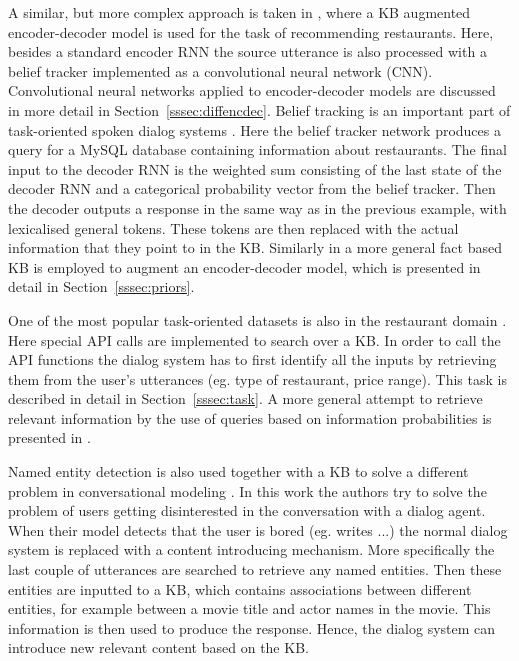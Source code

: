 \documentclass[12pt]{article}
\begin{document}
A similar, but more complex approach is taken in \cite{Wen:2016}, where a KB augmented encoder-decoder model is used for the task of recommending restaurants. Here, besides a standard encoder RNN the source utterance is also processed with a belief tracker implemented as a convolutional neural network (CNN). Convolutional neural networks applied to encoder-decoder models are discussed in more detail in Section~\ref{sssec:diffencdec}. Belief tracking is an important part of task-oriented spoken dialog systems \cite{Henderson:2015}. Here the belief tracker network produces a query for a MySQL database containing information about restaurants. The final input to the decoder RNN is the weighted sum consisting of the last state of the decoder RNN and a categorical probability vector from the belief tracker. Then the decoder outputs a response in the same way as in the previous example, with lexicalised general tokens. These tokens are then replaced with the actual information that they point to in the KB. Similarly in \cite{Ghazvininejad:2017} a more general fact based KB is employed to augment an encoder-decoder model, which is presented in detail in Section~\ref{sssec:priors}.

One of the most popular task-oriented datasets is also in the restaurant domain \cite{Joshi:2017}. Here special API calls are implemented to search over a KB. In order to call the API functions the dialog system has to first identify all the inputs by retrieving them from the user's utterances (eg. type of restaurant, price range). This task is described in detail in Section~\ref{sssec:task}. A more general attempt to retrieve relevant information by the use of queries based on information probabilities is presented in \cite{Yin:2017}.

Named entity detection is also used together with a KB to solve a different problem in conversational modeling \cite{stalemate:2016}. In this work the authors try to solve the problem of users getting disinterested in the conversation with a dialog agent. When their model detects that the user is bored (eg. writes ...) the normal dialog system is replaced with a content introducing mechanism. More specifically the last couple of utterances are searched to retrieve any named entities. Then these entities are inputted to a KB, which contains associations between different entities, for example between a movie title and actor names in the movie. This information is then used to produce the response. Hence, the dialog system can introduce new relevant content based on the KB.
\end{document}
